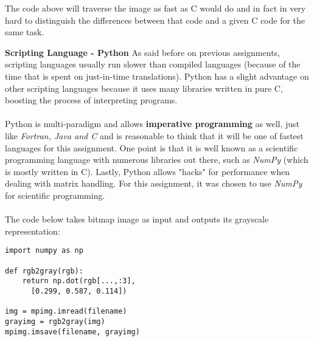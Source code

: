 \documentclass[conference]{IEEEtran}
\begin{document}
The code above will traverse the image as fast as C would do and in fact in very hard to distinguish the differences between that code and a given C code for the same task.

\textbf{ Scripting Language - Python }
As said before on previous assignments, scripting languages usually run slower than compiled languages (because of the time that is spent on just-in-time translations). Python has a slight advantage on other scripting languages because it uses many libraries written in pure C, boosting the process of interpreting programs.
\\\\
Python is multi-paradigm and allows \textbf{imperative programming} as well, just like \textit{Fortran, Java and C} and is reasonable to think that it will be one of fastest languages for this assignment. One point is that it is well known as a scientific programming language with numerous libraries out there, such as \textit{NumPy} (which is mostly written in C). Lastly, Python allows "hacks" for performance when dealing with matrix handling. For this assignment, it was chosen to use \textit{NumPy} for scientific programming.
\\\\
The code below takes bitmap image as input and outputs its grayscale representation:

\lstset{language=python}
\begin{lstlisting}[frame=single]
import numpy as np

def rgb2gray(rgb):
    return np.dot(rgb[...,:3],
      [0.299, 0.587, 0.114])

img = mpimg.imread(filename)     
grayimg = rgb2gray(img)    
mpimg.imsave(filename, grayimg)
\end{lstlisting}
\end{document}
